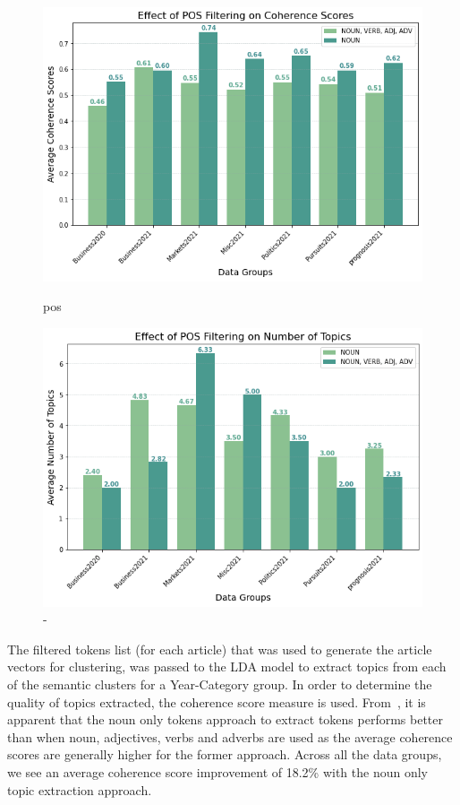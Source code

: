 \begin{figure}[H]
  \centering
    \begin{minipage}[t]{.49\linewidth}
      \centering
      \includegraphics[width=\linewidth]{images/eval/pos_coherence.png}
      \caption{pos}
      \label{fig:pos_topic}
    \end{minipage}
    \begin{minipage}[t]{.49\linewidth}
      \centering
      \includegraphics[width=\linewidth]{images/eval/topics_pos.png}
      \caption{-}
       \label{fig:topics_pos}
    \end{minipage}
  \end{figure}


\vspace{-1em}
The filtered tokens list (for each article) that was used to generate the article vectors for clustering, was passed to the LDA model to extract topics from each of the semantic clusters for a Year-Category group. In order to determine the quality of topics extracted, the coherence score measure is used. From~, it is apparent that the noun only tokens approach to extract tokens performs better than when noun, adjectives, verbs and adverbs are used as the average coherence scores are generally higher for the former approach. Across all the data groups, we see an average coherence score improvement of 18.2\% with the noun only topic extraction approach.  


